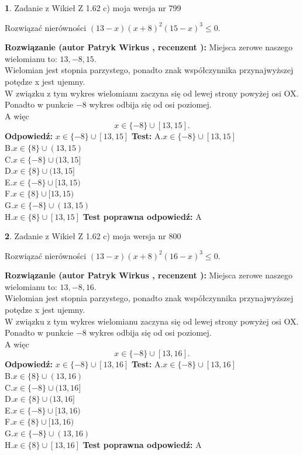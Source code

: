 \documentclass[12pt, a4paper]{article}
\theoremstyle{definition} %
\newtheorem{zad}{}
\newcommand{\zadStart}[1]{\begin{zad}#1\newline}
\newcommand{\zadStop}{\end{zad}}
\newcommand{\rozwStart}[2]{\noindent \textbf{Rozwiązanie (autor #1 , recenzent #2): }\newline}
\newcommand{\rozwStop}{\newline}
\newcommand{\odpStart}{\noindent \textbf{Odpowiedź:}\newline}
\newcommand{\odpStop}{\newline}
\newcommand{\testStart}{\noindent \textbf{Test:}\newline}
\newcommand{\testStop}{\newline}
\newcommand{\kluczStart}{\noindent \textbf{Test poprawna odpowiedź:}\newline}
\newcommand{\kluczStop}{\newline}
\begin{document}
\zadStart{Zadanie z Wikieł Z 1.62 c) moja wersja nr 799}

Rozwiązać nierówności $(13-x)(x+8)^{2}(15-x)^{3}\le0$.
\zadStop
\rozwStart{Patryk Wirkus}{}
Miejsca zerowe naszego wielomianu to: $13, -8, 15$.\\
Wielomian jest stopnia parzystego, ponadto znak współczynnika przy\linebreak najwyższej potędze x jest ujemny.\\ W związku z tym wykres wielomianu zaczyna się od lewej strony powyżej osi OX.\\
Ponadto w punkcie $-8$ wykres odbija się od osi poziomej.\\
A więc $$x \in \{-8\} \cup [13,15].$$
\rozwStop
\odpStart
$x \in \{-8\} \cup [13,15]$
\odpStop
\testStart
A.$x \in \{-8\} \cup [13,15]$\\
B.$x \in \{8\} \cup (13,15)$\\
C.$x \in \{-8\} \cup (13,15]$\\
D.$x \in \{8\} \cup (13,15]$\\
E.$x \in \{-8\} \cup [13,15)$\\
F.$x \in \{8\} \cup [13,15)$\\
G.$x \in \{-8\} \cup (13,15)$\\
H.$x \in \{8\} \cup [13,15]$
\testStop
\kluczStart
A
\kluczStop



\zadStart{Zadanie z Wikieł Z 1.62 c) moja wersja nr 800}

Rozwiązać nierówności $(13-x)(x+8)^{2}(16-x)^{3}\le0$.
\zadStop
\rozwStart{Patryk Wirkus}{}
Miejsca zerowe naszego wielomianu to: $13, -8, 16$.\\
Wielomian jest stopnia parzystego, ponadto znak współczynnika przy\linebreak najwyższej potędze x jest ujemny.\\ W związku z tym wykres wielomianu zaczyna się od lewej strony powyżej osi OX.\\
Ponadto w punkcie $-8$ wykres odbija się od osi poziomej.\\
A więc $$x \in \{-8\} \cup [13,16].$$
\rozwStop
\odpStart
$x \in \{-8\} \cup [13,16]$
\odpStop
\testStart
A.$x \in \{-8\} \cup [13,16]$\\
B.$x \in \{8\} \cup (13,16)$\\
C.$x \in \{-8\} \cup (13,16]$\\
D.$x \in \{8\} \cup (13,16]$\\
E.$x \in \{-8\} \cup [13,16)$\\
F.$x \in \{8\} \cup [13,16)$\\
G.$x \in \{-8\} \cup (13,16)$\\
H.$x \in \{8\} \cup [13,16]$
\testStop
\kluczStart
A
\kluczStop
\end{document}
